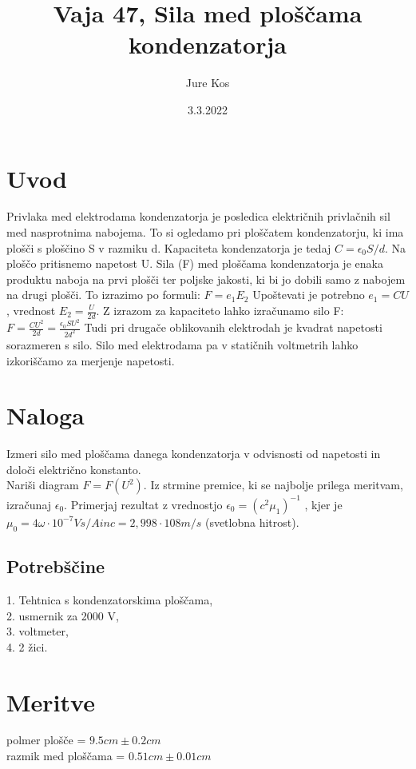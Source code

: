 \documentclass[a4paper]{report}
\author{Jure Kos}
\title{Vaja 47, Sila med ploščama kondenzatorja}
\date{3.3.2022}
\begin{document}
\maketitle

\chapter*{Uvod}

Privlaka med elektrodama kondenzatorja je posledica električnih privlačnih sil med nasprotnima nabojema. To si ogledamo pri ploščatem kondenzatorju, ki ima plošči s ploščino S v razmiku d. Kapaciteta kondenzatorja je tedaj $C=\epsilon_0S/d$. Na ploščo pritisnemo napetost U. Sila (F) med ploščama kondenzatorja je enaka produktu naboja na prvi plošči ter poljske jakosti, ki bi jo dobili samo z nabojem na drugi plošči. To izrazimo po formuli:
$F=e_1 E_2$
Upoštevati je potrebno $e_1=CU$, vrednost $E_2= \frac{U}{2d}$.
Z izrazom za kapaciteto lahko izračunamo silo F:
$F= \frac{CU^2}{2d}= \frac{\epsilon_0 SU^2}{2d^2}$
Tudi pri drugače oblikovanih elektrodah je kvadrat napetosti sorazmeren s silo. Silo med elektrodama pa v statičnih voltmetrih lahko izkoriščamo za merjenje napetosti. 

\chapter*{Naloga}
Izmeri silo med ploščama danega kondenzatorja v odvisnosti od napetosti in določi električno konstanto. \\
Nariši diagram $F = F(U^2)$. Iz strmine premice, ki se najbolje prilega meritvam, izračunaj $\epsilon_0$. Primerjaj rezultat z vrednostjo $\epsilon_0 = (c^2\mu_1)^{-1}$ , kjer je $\mu_0 = 4\omega \cdot 10^{-7} Vs/A in c = 2,998\cdot 108 m/s$ (svetlobna hitrost).

\section*{Potrebščine}
1. Tehtnica s kondenzatorskima ploščama,\\
2. usmernik za 2000 V, \\
3. voltmeter, \\
4. 2 žici.

\chapter*{Meritve}

polmer plošče = $9.5cm \pm 0.2cm $\\
razmik med ploščama = $0.51cm \pm 0.01cm$ \\
\\
\end{document}
